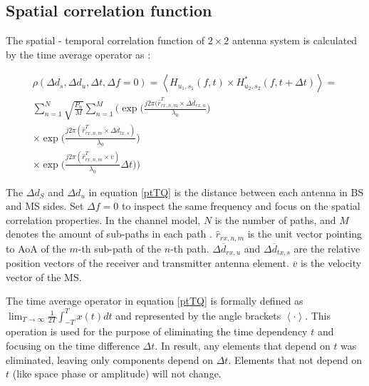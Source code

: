 \documentclass{article} %
\begin{document}
\subsection{Spatial correlation function}

The spatial - temporal correlation function of $2 \times 2$ antenna system is calculated by the time average operator as \cite{final_exam}:

\begin{adjustwidth}{-2cm}{0cm}
\begin{equation} \label{ptTQ}
\begin{split}
    \rho(\Delta d_s, \Delta d_u, \Delta t, \Delta f = 0)=\left\langle H_{u_1, s_1}(f,t) \times H_{u_2, s_2}^* (f,t+\Delta t) \right\rangle = \\
    \sum_{n=1}^{N}\sqrt{\frac{P_n}{M}}\sum_{n=1}^M
    \Bigg(
    \exp \Big( \frac{j2\pi(\hat{r}_{rx,n,m}^T \times \Delta \overline d_{rx,u}}{\lambda_0} \Big) \\
    \times \exp \Big( \frac{j2\pi(\hat{r}_{rx,n,m}^T \times \Delta \overline d_{tx,s})}{\lambda_0} \Big) \\
    \times \exp \Big( \frac{j2\pi(\hat{r}_{rx,n,m}^T \times \overline{v})}{\lambda_0} \Delta t \Big)
    \Bigg)
\end{split}
\end{equation}
\end{adjustwidth}

The $\Delta d_S$ and $\Delta d_u$ in equation \ref{ptTQ} is the distance between each antenna in BS and MS sides. Set $\Delta f = 0$ to inspect the same frequency and focus on the spatial correlation properties. In the channel model, $N$ is the number of paths, and $M$ denotes the amount of sub-paths in each path \cite{scm_onering}. $\hat{r}_{rx,n,m}$ is the unit vector pointing to AoA of the $m$-th sub-path of the $n$-th path. $\Delta \overline d_{rx, u}$ and $\Delta \overline d_{tx, s}$ are the relative position vectors of the receiver and transmitter antenna element. $\overline v$ is the velocity vector of the MS.

The time average operator in equation \ref{ptTQ} is formally defined as $\lim_{T\rightarrow\infty} \frac{1}{2T} \int_{-T}^{T} x(t)dt$ and represented by the angle brackets $\left\langle \cdot \right\rangle$. This operation is used for the purpose of eliminating the time dependency $t$ and focusing on the time difference $\Delta t$. In result, any elements that depend on $t$ was eliminated, leaving only components depend on $\Delta t$. Elements that not depend on $t$ (like space phase or amplitude) will not change. \cite{scm_onering}
\end{document}
